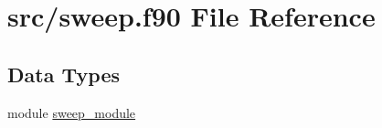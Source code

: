 \hypertarget{sweep_8f90}{\section{src/sweep.f90 File Reference}
\label{sweep_8f90}
}
\subsection*{Data Types}
\begin{DoxyCompactItemize}
\item 
module \hyperlink{classsweep__module}{sweep\-\_\-module}
\end{DoxyCompactItemize}
